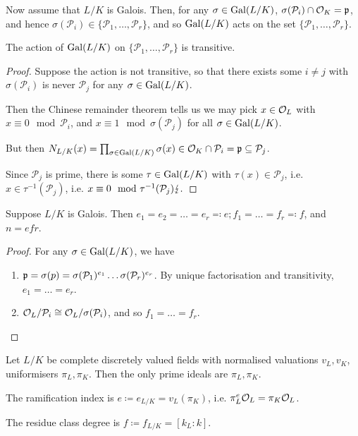 \documentclass[10pt,a4paper]{article}
\begin{document}
Now assume that $L/K$ is Galois. Then, for any $\sigma \in \operatorname{Gal}(L/K)$, $\sigma(\mathcal{P}_i) \cap \mathcal{O}_K = \mathfrak{p}$, and hence $\sigma(\mathcal{P}_i) \in \{\mathcal{P}_1, \ldots, \mathcal{P}_r\}$, and so $\operatorname{Gal}(L/K)$ acts on the set $\{\mathcal{P}_1, \ldots, \mathcal{P}_r\}$.

\begin{proposition}
  The action of $\operatorname{Gal}(L/K)$ on $\{\mathcal{P}_1, \ldots, \mathcal{P}_r\}$ is transitive.
\end{proposition}
\begin{proof}
  Suppose the action is not transitive, so that there exists some $i \neq j$ with $\sigma(\mathcal{P}_i)$ is never $\mathcal{P}_j$ for any $\sigma \in \operatorname{Gal}(L/K)$.

  Then the Chinese remainder theorem tells us we may pick $x \in \mathcal{O}_L$ with $x \equiv 0 \mod \mathcal{P}_i$, and $x \equiv 1 \mod \sigma(\mathcal{P}_j)$ for all $\sigma \in \operatorname{Gal}(L/K)$.

  But then $N_{L/K}(x) = \prod_{\sigma \in \operatorname{Gal}(L/K)} \sigma(x) \in \mathcal{O}_K \cap \mathcal{P}_i =\mathfrak{p} \subseteq \mathcal{P}_j$.

  Since $\mathcal{P}_j$ is prime, there is some $\tau \in \operatorname{Gal}(L/K)$ with $\tau(x) \in \mathcal{P}_j$, i.e. $x \in\tau^{-1}(\mathcal{P}_j)$, i.e. $x \equiv 0 \mod \tau^{-1}(\mathcal{P}_j) \lightning.$
\end{proof}
\begin{corollary}
  Suppose $L/K$ is Galois. Then $e_1 = e_2 = \ldots = e_r \eqqcolon e; f_1 = \ldots = f_r \eqqcolon f$, and $n = efr$.
\end{corollary}
\begin{proof}
  For any $\sigma \in \operatorname{Gal}(L/K)$, we have
  \begin{enumerate}
    \item $\mathfrak{p} = \sigma(p) = \sigma(\mathcal{P}_1)^{e_1}\ldots \sigma(\mathcal{P}_r)^{e_r}$. By unique factorisation and transitivity, $e_1 = \ldots = e_r$.
    \item $\mathcal{O}_L/\mathcal{P}_i \cong \mathcal{O}_L/\sigma(\mathcal{P}_i)$, and so $f_1 = \ldots = f_r$.
  \end{enumerate}
\end{proof}
Let $L/K$ be complete discretely valued fields with normalised valuations $v_L, v_K$, uniformisers $\pi_L, \pi_K$. Then the only prime ideals are $\pi_L, \pi_K$.

The ramification index is $e \coloneqq e_{L/K} = v_L(\pi_K)$, i.e. $\pi_L^e \mathcal{O}_L = \pi_K \mathcal{O}_L$.

The residue class degree is $f \coloneqq f_{L/K} = [k_L:k]$.
\end{document}
